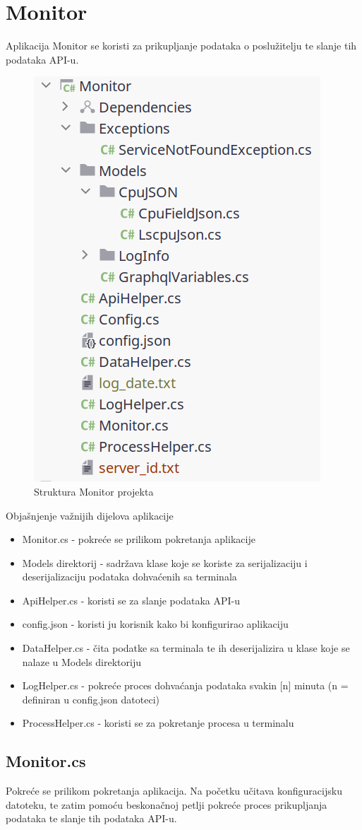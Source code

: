 \documentclass[zavrsnirad]{fer}
\begin{document}
\chapter{Monitor}
Aplikacija Monitor se koristi za prikupljanje podataka o poslužitelju te slanje tih podataka API-u.

\begin{figure}[htb!]
	\centering
	\includegraphics[width=0.4\linewidth]{images/monitor_structure.png} 
	\caption{Struktura Monitor projekta}
	\label{slk:monitor_structure.png}
\end{figure}

Objašnjenje važnijih dijelova aplikacije
\begin{itemize}
	\item Monitor.cs - pokreće se prilikom pokretanja aplikacije
	\item Models direktorij - sadržava klase koje se koriste za serijalizaciju i deserijalizaciju podataka dohvaćenih sa terminala
	\item ApiHelper.cs - koristi se za slanje podataka API-u
	\item config.json - koristi ju korisnik kako bi konfigurirao aplikaciju
	\item DataHelper.cs - čita podatke sa terminala te ih deserijalizira u klase koje se nalaze u Models direktoriju
	\item LogHelper.cs - pokreće proces dohvaćanja podataka svakin [n] minuta (n = definiran u config.json datoteci)
	\item ProcessHelper.cs - koristi se za pokretanje procesa u terminalu
\end{itemize}

\section{Monitor.cs}
Pokreće se prilikom pokretanja aplikacija. Na početku učitava konfiguracijsku datoteku, te zatim pomoću beskonačnoj petlji pokreće proces prikupljanja podataka te slanje tih podataka API-u.

\end{document}
